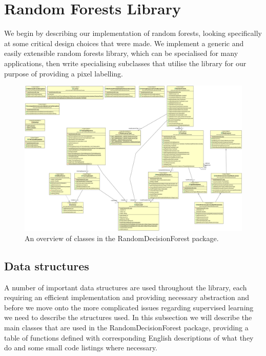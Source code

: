 \documentclass[12pt,twoside,notitlepage]{report}
\begin{document}
    \section{Random Forests Library}
        We begin by describing our implementation of random forests, looking specifically at some critical design 
        choices that were made. We implement a generic and easily extensible random forests library, which can 
        be specialised for many applications, then write specialising subclasses that utilise the library for our 
        purpose of providing a pixel labelling.

        \begin{figure}[H]
            \centering
            \includegraphics[scale=0.25, angle=90]{Forest_UML}
            \caption{An overview of classes in the RandomDecisionForest package.}
            \label{fig:forest_uml}
        \end{figure}

        \subsection{Data structures}
            A number of important data structures are used throughout the library, each requiring an efficient 
            implementation and providing necessary abstraction and before we move onto the more complicated issues 
            regarding supervised learning we need to describe the structures used. In this subsection 
            we will describe the main classes that are used in the RandomDecisionForest package, providing a table of 
            functions defined with corresponding English descriptions of what they do and some small code listings 
            where necessary.
\end{document}
